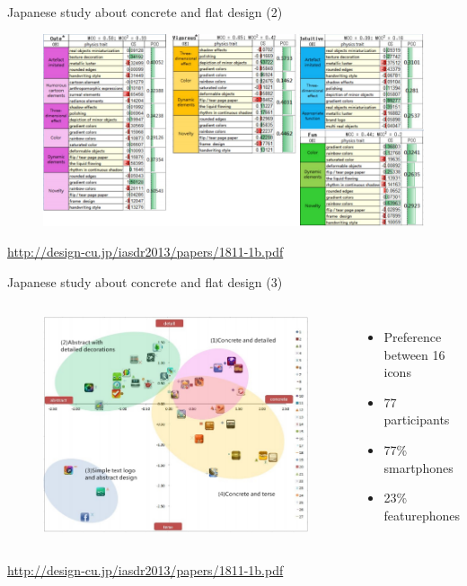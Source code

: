 \documentclass{beamer}
\begin{document}
\begin{frame}{Japanese study about concrete and flat design (2)}
    \begin{figure}
        \centering
        \includegraphics[scale=0.45]{caract.png}
      \end{figure}
	\begin{flushright}\tiny\url{http://design-cu.jp/iasdr2013/papers/1811-1b.pdf}\normalsize\end{flushright}
\end{frame}

\begin{frame}{Japanese study about concrete and flat design (3)}
	\begin{columns}[c]
      \begin{figure}
        \centering
        \includegraphics[scale=0.45]{map.png}
      \end{figure}
      \begin{itemize}
        \item Preference between 16 icons
        \item 77 participants
        \item 77\% smartphones
        \item 23\% featurephones
      \end{itemize}
	\end{columns}
	\begin{flushright}\tiny\url{http://design-cu.jp/iasdr2013/papers/1811-1b.pdf}\normalsize\end{flushright}
\end{frame}
\end{document}
